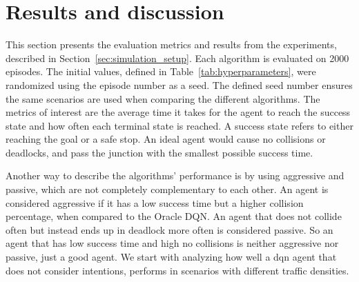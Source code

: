 \section{Results and discussion}\label{sec:results}
This section presents the evaluation metrics and results from the experiments, described in Section~\ref{sec:simulation_setup}. 
Each algorithm is evaluated on \num{2000} episodes. 
The initial values, defined in Table~\ref{tab:hyperparameters}, were randomized using the episode number as a seed. The defined seed number ensures the same scenarios are used when comparing the different algorithms. 
The metrics of interest are the average time it takes for the agent to reach the success state and how often each terminal state is reached. A success state refers to either reaching the goal or a safe stop. An ideal agent would cause no collisions or deadlocks, and pass the junction with the smallest possible success time.

Another way to describe the algorithms' performance is by using aggressive and passive, which are not completely complementary to each other. An agent is considered aggressive if it has a low success time but a higher collision percentage, when compared to the Oracle DQN. An agent that does not collide often but instead ends up in deadlock more often is considered passive. So an agent that has low success time and high no collisions is neither aggressive nor passive, just a good agent.
We start with analyzing how well a \gls{dqn} agent that does not consider intentions, performs in scenarios with different traffic densities. 



